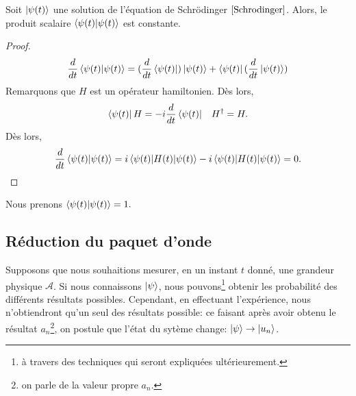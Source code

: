 \documentclass[../notesdecours.tex]{subfiles}
\begin{document}
\begin{Property} Soit $\ket{\psi(t)}$ une solution de l'équation de Schrödinger $\eqref{Schrodinger}$. Alors, le produit scalaire $\braket{\psi(t)|\psi(t)}$ est constante. \end{Property}
\begin{proof}
\begin{equation}
\frac{d}{dt} \braket{\psi(t)|\psi(t)} = (\frac{d}{dt}\bra{\psi(t)})\ket{\psi(t)} + \bra{\psi(t)}(\frac{d}{dt}\ket{\psi(t)})
\end{equation}
Remarquons que $H$ est un opérateur hamiltonien. Dès lors,
\begin{align}
\bra{\psi(t)}H &= -i\frac{d}{dt}\bra{\psi(t)}		&H^\dag = H.
\end{align}
Dès lors,
\begin{align}
\frac{d}{dt} \braket{\psi(t)|\psi(t)} = i \braket{\psi(t) | H(t) | \psi(t)} - i \braket{\psi(t)|H(t)|\psi(t)} = 0.
\end{align}
\end{proof}

\begin{remark} Nous prenons $\braket{\psi(t)|\psi(t)} = 1.$ \end{remark}

\subsection{Réduction du paquet d'onde}
Supposons que nous souhaitions mesurer, en un instant $t$ donné, une grandeur physique $\mathcal{A}$. Si nous connaissons $\ket{\psi}$, nous pouvons\footnote{à travers des techniques qui seront expliquées ultérieurement.} obtenir les probabilité des différents résultats possibles. Cependant, en effectuant l'expérience, nous n'obtiendront qu'un seul des résultats possible: ce faisant après avoir obtenu le résultat $a_n$\footnote{on parle de la valeur propre $a_n$.}, on postule que l'état du sytème change: $\ket{\psi} \to \ket{u_n}$.

\begin{center}
\end{center}
\end{document}
